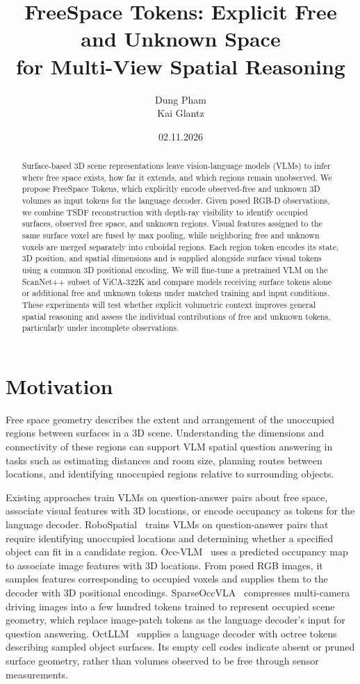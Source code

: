 \documentclass[10pt,twocolumn,letterpaper]{article}
\title{\vspace{-1.2em}\bfseries
FreeSpace Tokens: Explicit Free and Unknown Space\\
for Multi-View Spatial Reasoning}
\author{Dung Pham\\Kai Glantz}
\date{02.11.2026}
\begin{document}
\maketitle
\vspace{-2.2em}

\begin{abstract}
Surface-based 3D scene representations leave vision-language models (VLMs) to infer where free space exists, how far it extends, and which regions remain unobserved. We propose FreeSpace Tokens, which explicitly encode observed-free and unknown 3D volumes as input tokens for the language decoder. Given posed RGB-D observations, we combine TSDF reconstruction with depth-ray visibility to identify occupied surfaces, observed free space, and unknown regions. Visual features assigned to the same surface voxel are fused by max pooling, while neighboring free and unknown voxels are merged separately into cuboidal regions. Each region token encodes its state, 3D position, and spatial dimensions and is supplied alongside surface visual tokens using a common 3D positional encoding. We will fine-tune a pretrained VLM on the ScanNet++ subset of ViCA-322K and compare models receiving surface tokens alone or additional free and unknown tokens under matched training and input conditions. These experiments will test whether explicit volumetric context improves general spatial reasoning and assess the individual contributions of free and unknown tokens, particularly under incomplete observations.
\end{abstract}

\section{Motivation}

Free space geometry describes the extent and arrangement of the unoccupied regions between surfaces in a 3D scene. Understanding the dimensions and connectivity of these regions can support VLM spatial question answering in tasks such as estimating distances and room size, planning routes between locations, and identifying unoccupied regions relative to surrounding objects.

Existing approaches train VLMs on question-answer pairs about free space, associate visual features with 3D locations, or encode occupancy as tokens for the language decoder. RoboSpatial~\cite{robospatial} trains VLMs on question-answer pairs that require identifying unoccupied locations and determining whether a specified object can fit in a candidate region. Occ-VLM~\cite{occvlm} uses a predicted occupancy map to associate image features with 3D locations. From posed RGB images, it samples features corresponding to occupied voxels and supplies them to the decoder with 3D positional encodings. SparseOccVLA~\cite{sparseoccvla} compresses multi-camera driving images into a few hundred tokens trained to represent occupied scene geometry, which replace image-patch tokens as the language decoder’s input for question answering. OctLLM~\cite{octllm} supplies a language decoder with octree tokens describing sampled object surfaces. Its empty cell codes indicate absent or pruned surface geometry, rather than volumes observed to be free through sensor measurements.
\end{document}
